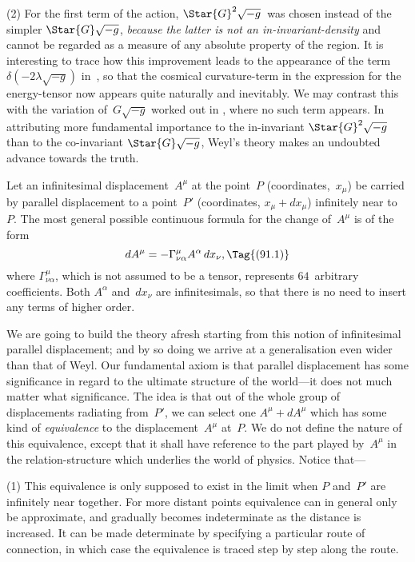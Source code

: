 \documentclass[12pt]{book}
\begin{document}
(2) For the first term of the action, $\Star{G}^{2} \sqrt{-g}$~was chosen instead of the
simpler $\Star{G} \sqrt{-g}$, \emph{because the latter is not an in\hyp{}invariant\hyp{}density} and cannot
be regarded as a measure of any absolute property of the region. It is
interesting to trace how this improvement leads to the appearance of the term
$\delta (-2\lambda \sqrt{-g})$ in~, so that the cosmical curvature\hyp{}term in the expression
for the energy\hyp{}tensor now appears quite naturally and inevitably. We may
contrast this with the variation of~$G \sqrt{-g}$ worked out in , where no such
term appears. In attributing more fundamental importance to the in\hyp{}invariant
$\Star{G}^{2} \sqrt{-g}$ than to the co\hyp{}invariant $\Star{G} \sqrt{-g}$, Weyl's theory makes an undoubted
advance towards the truth.


%
%
%
%

Let an infinitesimal displacement~$A^{\mu}$ at the point~$P$ (coordinates,~$x_{\mu}$) be
carried by parallel displacement to a point~$P'$ (coordinates, $x_{\mu} + dx_{\mu}$) infinitely
near to~$P$. The most general possible continuous formula for the change of~$A^{\mu}$
is of the form
\[
dA^{\mu} = -\Gamma_{\nu\alpha}^{\mu} A^{\alpha}\, dx_{\nu},
\Tag{(91.1)}
\]
where $\Gamma_{\nu\alpha}^{\mu}$, which is not assumed to be a tensor, represents $64$~arbitrary
coefficients. Both $A^{\alpha}$ and~$dx_{\nu}$ are infinitesimals, so that there is no need to
insert any terms of higher order.

We are going to build the theory afresh starting from this notion of
infinitesimal parallel displacement; and by so doing we arrive at a generalisation
even wider than that of Weyl. Our fundamental axiom is that parallel
displacement has some significance in regard to the ultimate structure of the
world---it does not much matter what significance. The idea is that out of the
whole group of displacements radiating from~$P'$, we can select one $A^{\mu} + dA^{\mu}$
which has some kind of \emph{equivalence} to the displacement~$A^{\mu}$ at~$P$. We do not
define the nature of this equivalence, except that it shall have reference to the
part played by~$A^{\mu}$ in the relation\hyp{}structure which underlies the world of physics.
Notice that---

(1) This equivalence is only supposed to exist in the limit when $P$ and~$P'$
are infinitely near together. For more distant points equivalence can in general
only be approximate, and gradually becomes indeterminate as the distance is
increased. It can be made determinate by specifying a particular route of
connection, in which case the equivalence is traced step by step along the
route.
\end{document}

